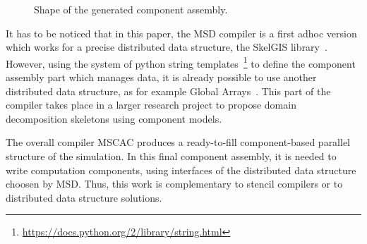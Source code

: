 \begin{figure*}
\begin{center}
\caption{Shape of the generated component assembly.}
\label{fig:assembly}
\end{center}
\end{figure*}

It has to be noticed that in this paper, the MSD compiler is a first adhoc version which works for a precise distributed data structure, the SkelGIS library~\cite{HeleneLS13,HeleneLS14,HeleneEuroPar14,CPE:CPE3494}. However, using the system of python string templates~\footnote{\url{https://docs.python.org/2/library/string.html}} to define the component assembly part which manages data, it is already possible to use another distributed data structure, as for example Global Arrays~\cite{Nieplocha:2006:AAP:1125980.1125985}. This part of the compiler takes place in a larger research project to propose domain decomposition skeletons using component models.

The overall compiler MSCAC produces a ready-to-fill component-based parallel structure of the simulation. In this final component assembly, it is needed to write computation components, using interfaces of the distributed data structure choosen by MSD. Thus, this work is complementary to stencil compilers or to distributed data structure solutions.